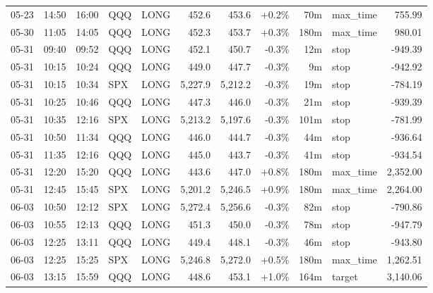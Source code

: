 \documentclass[11pt,a4paper,twoside]{article}
\begin{document}
\begin{center}
\begin{longtable}{>{\color{txtmain}}l l l l l r r r r >{\color{txtmain}}l r}
05-23 & 14:50 & 16:00 & QQQ & LONG & 452.6 & 453.6 & \textcolor{wingreen}{+0.2\%} & 70m & max\_time & \textcolor{wingreen}{755.99} \\
05-30 & 11:05 & 14:05 & QQQ & LONG & 452.3 & 453.7 & \textcolor{wingreen}{+0.3\%} & 180m & max\_time & \textcolor{wingreen}{980.01} \\
05-31 & 09:40 & 09:52 & QQQ & LONG & 452.1 & 450.7 & \textcolor{lossred}{-0.3\%} & 12m & stop & \textcolor{lossred}{-949.39} \\
05-31 & 10:15 & 10:24 & QQQ & LONG & 449.0 & 447.7 & \textcolor{lossred}{-0.3\%} & 9m & stop & \textcolor{lossred}{-942.92} \\
05-31 & 10:15 & 10:34 & SPX & LONG & 5,227.9 & 5,212.2 & \textcolor{lossred}{-0.3\%} & 19m & stop & \textcolor{lossred}{-784.19} \\
05-31 & 10:25 & 10:46 & QQQ & LONG & 447.3 & 446.0 & \textcolor{lossred}{-0.3\%} & 21m & stop & \textcolor{lossred}{-939.39} \\
05-31 & 10:35 & 12:16 & SPX & LONG & 5,213.2 & 5,197.6 & \textcolor{lossred}{-0.3\%} & 101m & stop & \textcolor{lossred}{-781.99} \\
05-31 & 10:50 & 11:34 & QQQ & LONG & 446.0 & 444.7 & \textcolor{lossred}{-0.3\%} & 44m & stop & \textcolor{lossred}{-936.64} \\
05-31 & 11:35 & 12:16 & QQQ & LONG & 445.0 & 443.7 & \textcolor{lossred}{-0.3\%} & 41m & stop & \textcolor{lossred}{-934.54} \\
05-31 & 12:20 & 15:20 & QQQ & LONG & 443.6 & 447.0 & \textcolor{wingreen}{+0.8\%} & 180m & max\_time & \textcolor{wingreen}{2,352.00} \\
05-31 & 12:45 & 15:45 & SPX & LONG & 5,201.2 & 5,246.5 & \textcolor{wingreen}{+0.9\%} & 180m & max\_time & \textcolor{wingreen}{2,264.00} \\
06-03 & 10:50 & 12:12 & SPX & LONG & 5,272.4 & 5,256.6 & \textcolor{lossred}{-0.3\%} & 82m & stop & \textcolor{lossred}{-790.86} \\
06-03 & 10:55 & 12:13 & QQQ & LONG & 451.3 & 450.0 & \textcolor{lossred}{-0.3\%} & 78m & stop & \textcolor{lossred}{-947.79} \\
06-03 & 12:25 & 13:11 & QQQ & LONG & 449.4 & 448.1 & \textcolor{lossred}{-0.3\%} & 46m & stop & \textcolor{lossred}{-943.80} \\
06-03 & 12:25 & 15:25 & SPX & LONG & 5,246.8 & 5,272.0 & \textcolor{wingreen}{+0.5\%} & 180m & max\_time & \textcolor{wingreen}{1,262.51} \\
06-03 & 13:15 & 15:59 & QQQ & LONG & 448.6 & 453.1 & \textcolor{wingreen}{+1.0\%} & 164m & target & \textcolor{wingreen}{3,140.06} \\

\end{longtable}
\end{center}
\end{document}
